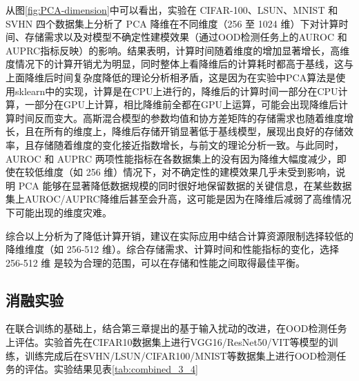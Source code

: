 从图\ref{fig:PCA-dimension}中可以看出，实验在 CIFAR-100、LSUN、MNIST 和 SVHN 四个数据集上分析了 PCA 降维在不同维度（256 至 1024 维）下对计算时间、存储需求以及对模型不确定性建模效果（通过OOD检测任务上的AUROC 和 AUPRC指标反映）的影响。结果表明，计算时间随着维度的增加显著增长，高维度情况下的计算开销尤为明显，同时整体上看降维后的计算耗时都高于基线，这与上面降维后时间复杂度降低的理论分析相矛盾，这是因为在实验中PCA算法是使用sklearn中的实现，计算是在CPU上进行的，降维后的计算时间一部分在CPU计算，一部分在GPU上计算，相比降维前全都在GPU上运算，可能会出现降维后计算时间反而变大。高斯混合模型的参数均值和协方差矩阵的存储需求也随着维度增长，且在所有的维度上，降维后存储开销显著低于基线模型，展现出良好的存储效率，且存储随着维度的变化接近指数增长，与前文的理论分析一致。与此同时，AUROC 和 AUPRC 两项性能指标在各数据集上的没有因为降维大幅度减少，即使在较低维度（如 256 维）情况下，对不确定性的建模效果几乎未受到影响，说明 PCA 能够在显著降低数据规模的同时很好地保留数据的关键信息，在某些数据集上AUROC/AUPRC降维后甚至会升高，这可能是因为在降维后减弱了高维情况下可能出现的维度灾难。

综合以上分析为了降低计算开销，建议在实际应用中结合计算资源限制选择较低的降维维度（如 256-512 维）。综合存储需求、计算时间和性能指标的变化，选择 256-512 维 是较为合理的范围，可以在存储和性能之间取得最佳平衡。

\subsection{消融实验}
在联合训练的基础上，结合第三章提出的基于输入扰动的改进，在OOD检测任务上评估。实验首先在CIFAR10数据集上进行VGG16/ResNet50/VIT等模型的训练，训练完成后在SVHN/LSUN/CIFAR100/MNIST等数据集上进行OOD检测任务的评估。实验结果见表\ref{tab:combined_3_4}

